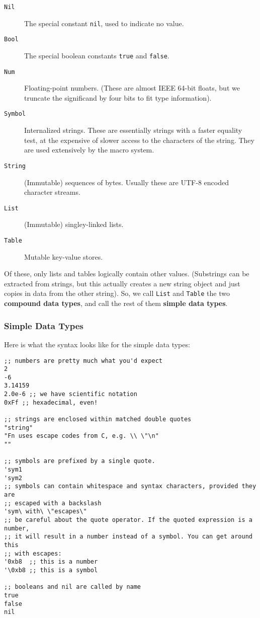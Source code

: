 \documentclass[11pt]{article}
\begin{document}
\begin{description}
\item[{\texttt{Nil}}] The special constant \texttt{nil}, used to indicate no value.
\item[{\texttt{Bool}}] The special boolean constants \texttt{true} and \texttt{false}.
\item[{\texttt{Num}}] Floating-point numbers. (These are almost IEEE 64-bit floats, but we
truncate the significand by four bits to fit type information).
\item[{\texttt{Symbol}}] Internalized strings. These are essentially strings with a faster
equality test, at the expensive of slower access to the characters of the
string. They are used extensively by the macro system.
\item[{\texttt{String}}] (Immutable) sequences of bytes. Usually these are UTF-8 encoded
character streams.
\item[{\texttt{List}}] (Immutable) singley-linked lists.
\item[{\texttt{Table}}] Mutable key-value stores.
\end{description}

Of these, only lists and tables logically contain other values. (Substrings can
be extracted from strings, but this actually creates a new string object and
just copies in data from the other string). So, we call \texttt{List} and \texttt{Table} the two
\textbf{compound data types}, and call the rest of them \textbf{simple data types}.

\subsubsection{Simple Data Types}
\label{sec:org10b3e3a}
Here is what the syntax looks like for the simple data types:

\begin{verbatim}
;; numbers are pretty much what you'd expect
2
-6
3.14159
2.0e-6 ;; we have scientific notation
0xFf ;; hexadecimal, even!

;; strings are enclosed within matched double quotes
"string"
"Fn uses escape codes from C, e.g. \\ \"\n"
""

;; symbols are prefixed by a single quote.
'sym1
'sym2
;; symbols can contain whitespace and syntax characters, provided they are 
;; escaped with a backslash
'sym\ with\ \"escapes\"
;; be careful about the quote operator. If the quoted expression is a number,
;; it will result in a number instead of a symbol. You can get around this 
;; with escapes:
'0xb8  ;; this is a number
'\0xb8 ;; this is a symbol

;; booleans and nil are called by name
true
false
nil
\end{verbatim}
\end{document}
